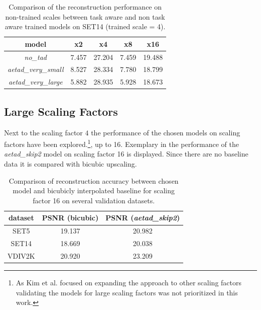 \begin{table}[!htbp]
    \begin{center}
    \begin{tabular}{c|c|c|c|c}
    model & x2 & x4 & x8 & x16 \\
    \hline
    \textit{no\_tad} & 7.457 & 27.204 & 7.459 & 19.488 \\
    \textit{aetad\_very\_small} & 8.527 & 28.334 & 7.780 & 18.799 \\
    \textit{aetad\_very\_large} & 5.882 & 28.935 & 5.928 & 18.673 \\
    \end{tabular}
    \caption{Comparison of the reconstruction performance on non-trained scales between task aware and non task aware trained models on SET14 (trained scale = 4).}
    \label{table:sisrotherscales}
    \end{center}
\end{table}

\subsection*{Large Scaling Factors}
Next to the scaling factor $4$ the performance of the chosen models on scaling factors have been explored.\footnote{As Kim et al. \cite{TAID} focused on expanding the approach to other scaling factors validating the models for large scaling factors was not prioritized in this work.}, up to 16. Exemplary in  the performance of the \textit{aetad\_skip2} model on scaling factor 16 is displayed. Since there are no baseline data it is compared with bicubic upscaling. 

\begin{table}[!htbp]
    \begin{center}
    \begin{tabular}{c|c|c}
    dataset & PSNR (bicubic) & PSNR (\textit{aetad\_skip2})\\
    \hline
    SET5 & 19.137 & 20.982 \\
    SET14 & 18.669 & 20.038 \\
    VDIV2K & 20.920 & 23.209 \\
    \end{tabular}
    \caption{Comparison of reconstruction accuracy between chosen model and bicubicly interpolated baseline for scaling factor 16 on several validation datasets. }
    \label{table:sisperformance_16}
    \end{center}
\end{table}

